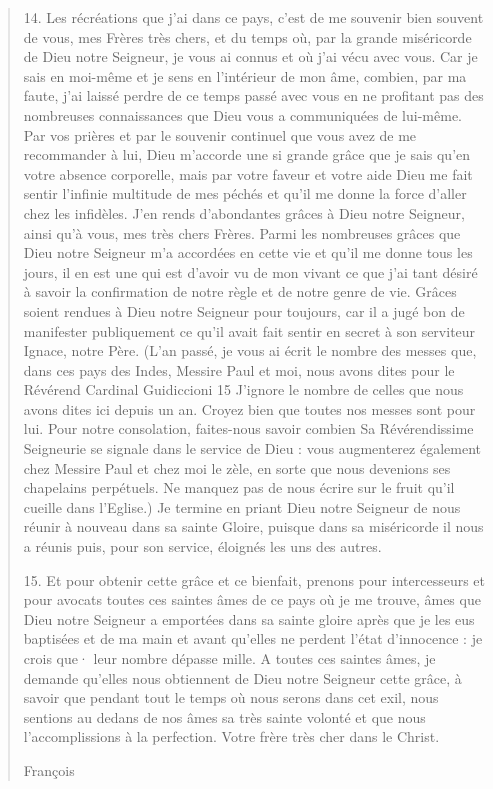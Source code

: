 \begin{quote}
14. Les récréations que j'ai dans ce pays, c'est de me souvenir
bien souvent de vous, mes Frères très chers, et du temps où, par
la grande miséricorde de Dieu notre Seigneur, je vous ai connus
et où j'ai vécu avec vous. Car je sais en moi-même et je sens en
l'intérieur de mon âme, combien, par ma faute, j'ai laissé perdre
de ce temps passé avec vous en ne profitant pas des nombreuses
 connaissances que Dieu vous a communiquées de lui-même. Par
vos prières et par le souvenir continuel que vous avez de me recommander
à lui, Dieu m'accorde une si grande grâce que je sais qu'en
votre absence corporelle, mais par votre faveur et votre aide Dieu
me fait sentir l'infinie multitude de mes péchés et qu'il me donne
la force d'aller chez les infidèles. J'en rends d'abondantes grâces
à Dieu notre Seigneur, ainsi qu'à vous, mes très chers Frères.
Parmi les nombreuses grâces que Dieu notre Seigneur m'a accordées
en cette vie et qu'il me donne tous les jours, il en est une qui
est d'avoir vu de mon vivant ce que j'ai tant désiré à savoir la confirmation
de notre règle et de notre genre de vie. Grâces soient rendues
à Dieu notre Seigneur pour toujours, car il a jugé bon de
manifester publiquement ce qu'il avait fait sentir en secret à son
serviteur Ignace, notre Père.
(L'an passé, je vous ai écrit le nombre des messes que, dans ces
pays des Indes, Messire Paul et moi, nous avons dites pour le Révérend
Cardinal Guidiccioni 15 J'ignore le nombre de celles que
nous avons dites ici depuis un an. Croyez bien que toutes nos messes
sont pour lui. Pour notre consolation, faites-nous savoir combien
Sa Révérendissime Seigneurie se signale dans le service de
Dieu : vous augmenterez également chez Messire Paul et chez moi
le zèle, en sorte que nous devenions ses chapelains perpétuels. Ne
manquez pas de nous écrire sur le fruit qu'il cueille dans l'Eglise.)
Je termine en priant Dieu notre Seigneur de nous réunir à nouveau
dans sa sainte Gloire, puisque dans sa miséricorde il nous a
réunis puis, pour son service, éloignés les uns des autres.



15. Et pour obtenir cette grâce et ce bienfait, prenons pour intercesseurs
et pour avocats toutes ces saintes âmes de ce pays où je
me trouve, âmes que Dieu notre Seigneur a emportées dans sa
sainte gloire après que je les eus baptisées et de ma main et avant
qu'elles ne perdent l'état d'innocence : je crois que· leur nombre
dépasse mille. A toutes ces saintes âmes, je demande qu'elles nous
obtiennent de Dieu notre Seigneur cette grâce, à savoir que pendant
tout le temps où nous serons dans cet exil, nous sentions au dedans
de nos âmes sa très sainte volonté et que nous l'accomplissions
à la perfection.
Votre frère très cher dans le Christ.

François
\end{quote}

